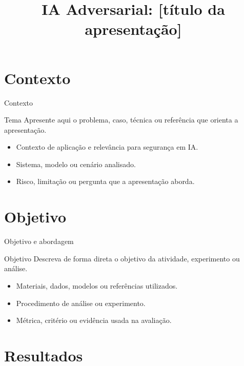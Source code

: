 
\newcommand{\sigla}{PCS5917}
\newcommand{\titulobase}{IA Adversarial: [título da apresentação]}

\title[\sigla]{\titulobase}
\label{titulo}

\def\presentationtocmode{short}


\section{Contexto}

\begin{frame}{Contexto}
\begin{block}{Tema}
Apresente aqui o problema, caso, técnica ou referência que orienta a apresentação.
\end{block}

\begin{itemize}
  \item Contexto de aplicação e relevância para segurança em IA.
  \item Sistema, modelo ou cenário analisado.
  \item Risco, limitação ou pergunta que a apresentação aborda.
\end{itemize}
\end{frame}

\section{Objetivo}

\begin{frame}{Objetivo e abordagem}
\begin{block}{Objetivo}
Descreva de forma direta o objetivo da atividade, experimento ou análise.
\end{block}

\begin{itemize}
  \item Materiais, dados, modelos ou referências utilizados.
  \item Procedimento de análise ou experimento.
  \item Métrica, critério ou evidência usada na avaliação.
\end{itemize}
\end{frame}

\section{Resultados}

